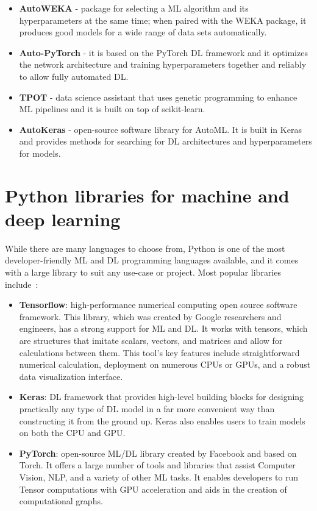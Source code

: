 \begin{itemize}
    \item \textbf{AutoWEKA} - package for selecting a \gls{ML} algorithm and its hyperparameters at the same time; when paired with the WEKA package, it produces good models for a wide range of data sets automatically.
    
    \item \textbf{Auto-PyTorch} - it is based on the PyTorch \gls{DL} framework and it optimizes the network architecture and training hyperparameters together and reliably to allow fully automated \gls{DL}.
    
    \item \textbf{TPOT} - data science assistant that uses genetic programming to enhance \gls{ML} pipelines and it is built on top of scikit-learn.
    
    \item \textbf{AutoKeras} - open-source software library for \gls{AutoML}. It is built in Keras and provides methods for searching for \gls{DL} architectures and hyperparameters for models. 
    
\end{itemize}


\section{Python libraries for machine and deep learning}\label{sec:ML_DL_libraries}

While there are many languages to choose from, Python is one of the most developer-friendly \gls{ML} and \gls{DL} programming languages available, and it comes with a large library to suit any use-case or project. Most popular libraries include~\cite{JonssonWaysDevelopment,Paszke2019PyTorch:Library}:

\begin{itemize}
    \item \textbf{Tensorflow}: high-performance numerical computing open source software framework. This library, which was created by Google researchers and engineers, has a strong support for \gls{ML} and \gls{DL}. It works with tensors, which are structures that imitate scalars, vectors, and matrices and allow for calculations between them. This tool's key features include straightforward numerical calculation, deployment on numerous CPUs or \gls{GPU}s, and a robust data visualization interface.
    \item \textbf{Keras}: \gls{DL} framework that provides high-level building blocks for designing practically any type of \gls{DL} model in a far more convenient way than constructing it from the ground up. Keras also enables users to train models on both the CPU and \gls{GPU}.
    \item \textbf{PyTorch}: open-source \gls{ML}/\gls{DL} library created by Facebook and based on Torch. It offers a large number of tools and libraries that assist Computer Vision, \gls{NLP}, and a variety of other \gls{ML} tasks. It enables developers to run Tensor computations with \gls{GPU} acceleration and aids in the creation of computational graphs.
\end{itemize}